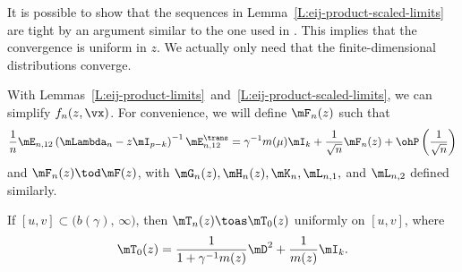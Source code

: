 \begin{remark}
    It is possible to show that the sequences in Lemma~\ref{L:eij-product-scaled-limits} are tight by an argument similar to the one used in \cite{onatski2009}.  This implies that the convergence is uniform in $z$.  We actually only need that the finite-dimensional distributions converge.
\end{remark}

With Lemmas~\ref{L:eij-product-limits}~and~\ref{L:eij-product-scaled-limits},
we can simplify $f_n(z, \vx)$.  For convenience, we will define
$\mF_n (z)$ such that
\[
    \frac{1}{n}
    \mE_{n,12}
    \left(
        \mLambda_n
        -
        z
        \mI_{p-k}
    \right)^{-1}
    \mE_{n,12}^\trans
        =
            \gamma^{-1}
            m(\mu)
            \mI_k
            +
            \frac{1}{\sqrt{n}}
            \mF_n(z)
            +
            \ohP\left(
                \frac{1}{\sqrt{n}}
            \right)
\]
and $\mF_n(z) \tod \mF(z)$,
with $\mG_n(z), \mH_n(z), \mK_n, \mL_{n,1},$ and $\mL_{n,2}$ defined similarly.

\begin{lemma}
    If $[u,v] \subset \big( b(\gamma), \, \infty \big)$, then
    \(
        \mT_n( z )
            \toas
                \mT_0( z )
    \)
    uniformly on $[u,v]$, where
    \[
        \mT_0( z )
            =
                \frac{1}{ 1 + \gamma^{-1} m(z) }
                \mD^2 
                +
                \frac{1}{m(z)}
                \mI_k.
    \]
\end{lemma}

